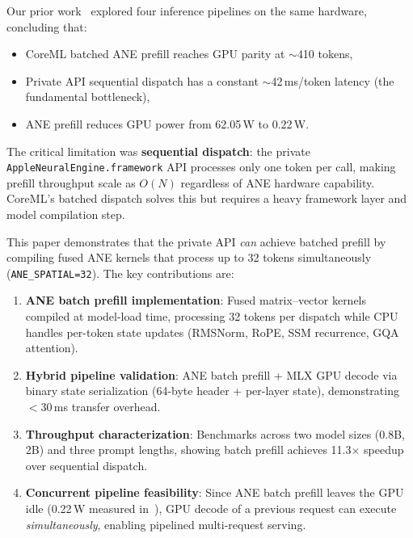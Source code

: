 \documentclass[11pt]{article}
\begin{document}
Our prior work~\cite{atomgradient2026hybrid} explored four inference
pipelines on the same hardware, concluding that:
\begin{itemize}[nosep]
  \item CoreML batched ANE prefill reaches GPU parity at $\sim$410 tokens,
  \item Private API sequential dispatch has a constant $\sim$42\,ms/token
        latency (the fundamental bottleneck),
  \item ANE prefill reduces GPU power from 62.05\,W to 0.22\,W.
\end{itemize}

The critical limitation was \textbf{sequential dispatch}: the private
\texttt{AppleNeuralEngine.framework} API processes only one token per
call, making prefill throughput scale as $O(N)$ regardless of ANE
hardware capability. CoreML's batched dispatch solves this but requires
a heavy framework layer and model compilation step.

This paper demonstrates that the private API \emph{can} achieve batched
prefill by compiling fused ANE kernels that process up to 32 tokens
simultaneously (\texttt{ANE\_SPATIAL=32}). The key contributions are:

\begin{enumerate}[nosep]
  \item \textbf{ANE batch prefill implementation}: Fused matrix--vector
        kernels compiled at model-load time, processing 32 tokens per
        dispatch while CPU handles per-token state updates (RMSNorm, RoPE,
        SSM recurrence, GQA attention).
  \item \textbf{Hybrid pipeline validation}: ANE batch prefill + MLX GPU
        decode via binary state serialization (64-byte header + per-layer
        state), demonstrating $<$30\,ms transfer overhead.
  \item \textbf{Throughput characterization}: Benchmarks across two model
        sizes (0.8B, 2B) and three prompt lengths, showing batch prefill
        achieves 11.3$\times$ speedup over sequential dispatch.
  \item \textbf{Concurrent pipeline feasibility}: Since ANE batch prefill
        leaves the GPU idle (0.22\,W measured in~\cite{atomgradient2026hybrid}),
        GPU decode of a previous request can execute \emph{simultaneously},
        enabling pipelined multi-request serving.
\end{enumerate}

\end{document}
